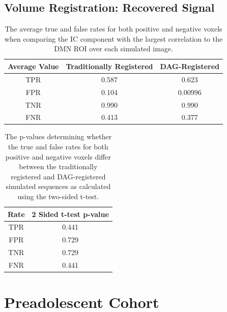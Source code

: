 \clearpage

\subsection{Volume Registration: Recovered Signal}


\begin{table}[]
\centering
\caption{The average true and false rates for both positive and negative voxels when comparing the IC component with the largest correlation to the DMN ROI over each simulated image.}
\label{tab:spectr-avg-rates}
\begin{tabular}{|c|c|c|}
\hline
\textbf{Average Value} & \textbf{Traditionally Registered} & \textbf{DAG-Registered} \\ \hline
TPR                    & 0.587                             & 0.623                   \\ \hline
FPR                    & 0.104                             & 0.00996                 \\ \hline
TNR                    & 0.990                             & 0.990                   \\ \hline
FNR                    & 0.413                             & 0.377                   \\ \hline
\end{tabular}
\end{table}

\begin{table}[]
\centering
\caption{The p-values determining whether the true and false rates for both positive and negative voxels differ between the traditionally registered and DAG-registered simulated sequences as calculated using the two-sided t-test.}
\label{tab:spectr-ttest-rates}
\begin{tabular}{|c|c|}
\hline
\textbf{Rate} & \textbf{2 Sided t-test p-value} \\ \hline
TPR           & 0.441                           \\ \hline
FPR           & 0.729                           \\ \hline
TNR           & 0.729                           \\ \hline
FNR           & 0.441                           \\ \hline
\end{tabular}
\end{table}

\clearpage

\section{Preadolescent Cohort}

